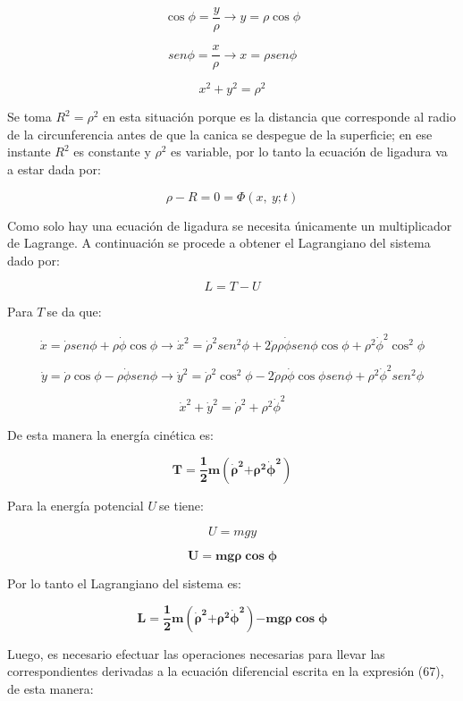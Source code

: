 \documentclass[]{article}
\begin{document}
\[\cos\phi = \frac{y}{\rho} \rightarrow y = \rho\cos\phi\]

\[{sen}\phi = \frac{x}{\rho} \rightarrow x = \rho{sen}\phi\]

\[x^{2} + y^{2} = \rho^{2}\]

Se toma \(R^{2} = \rho^{2}\) en esta situación porque es la distancia
que corresponde al radio de la circunferencia antes de que la canica se
despegue de la superficie; en ese instante \(R^{2}\) es constante y
\(\rho^{2}\) es variable, por lo tanto la ecuación de ligadura va a
estar dada por:

\[\rho - R = 0 = \Phi(x,\ y;t)\]

Como solo hay una ecuación de ligadura se necesita únicamente un
multiplicador de Lagrange. A continuación se procede a obtener el
Lagrangiano del sistema dado por:

\[L = T - U\]

Para \(T\ \)se da que:

\[\dot{x} = \dot{\rho}{sen}\phi + \rho\dot{\phi}\cos\phi \rightarrow {\dot{x}}^{2} = {\dot{\rho}}^{2}{sen}^{2}\phi + 2\dot{\rho}\rho\dot{\phi}{sen}\phi\cos\phi + \rho^{2}{\dot{\phi}}^{2}\cos^{2}\phi\]

\[\dot{y} = \dot{\rho}\cos\phi - \rho\dot{\phi}{sen}\phi \rightarrow {\dot{y}}^{2} = {\dot{\rho}}^{2}\cos^{2}\phi - 2\dot{\rho}\rho\dot{\phi}\cos\phi{sen}\phi + \rho^{2}{\dot{\phi}}^{2}{sen}^{2}\phi\]

\[{\dot{x}}^{2} + {\dot{y}}^{2} = {\dot{\rho}}^{2} + \rho^{2}{\dot{\phi}}^{2}\]

De esta manera la energía cinética es:

\[\mathbf{T =}\frac{\mathbf{1}}{\mathbf{2}}\mathbf{m}\left( {\dot{\mathbf{\rho}}}^{\mathbf{2}}\mathbf{+}\mathbf{\rho}^{\mathbf{2}}{\dot{\mathbf{\phi}}}^{\mathbf{2}} \right)\]

Para la energía potencial \(U\ \)se tiene:

\[U = mgy\]

\[\mathbf{U = mg\rho}\mathbf{\cos}\mathbf{\phi}\]

Por lo tanto el Lagrangiano del sistema es:

\[\mathbf{L =}\frac{\mathbf{1}}{\mathbf{2}}\mathbf{m}\left( {\dot{\mathbf{\rho}}}^{\mathbf{2}}\mathbf{+}\mathbf{\rho}^{\mathbf{2}}{\dot{\mathbf{\phi}}}^{\mathbf{2}} \right)\mathbf{- mg\rho}\mathbf{\cos}\mathbf{\phi}\]

Luego, es necesario efectuar las operaciones necesarias para llevar las
correspondientes derivadas a la ecuación diferencial escrita en la
expresión (67), de esta manera:
\end{document}
